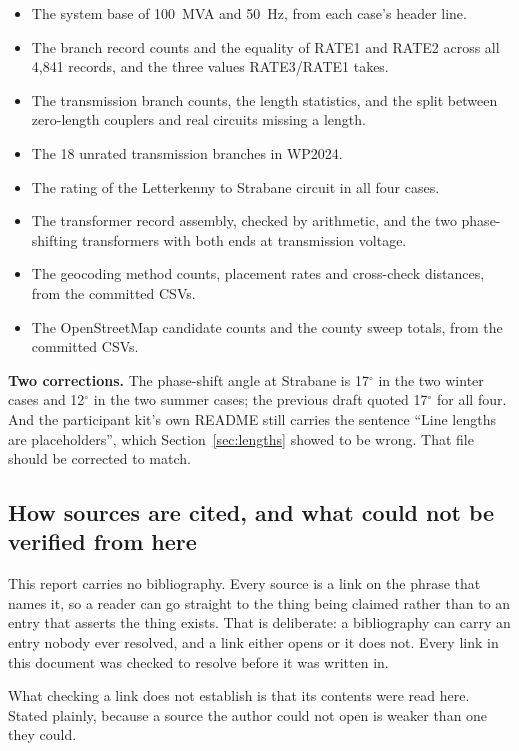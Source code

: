 \documentclass[11pt,a4paper]{article}
\begin{document}
\begin{itemize}
\item The system base of 100~MVA and 50~Hz, from each case's header line.
\item The branch record counts and the equality of RATE1 and RATE2 across all
      4{,}841 records, and the three values RATE3/RATE1 takes.
\item The transmission branch counts, the length statistics, and the split
      between zero-length couplers and real circuits missing a length.
\item The 18 unrated transmission branches in WP2024.
\item The rating of the Letterkenny to Strabane circuit in all four cases.
\item The transformer record assembly, checked by arithmetic, and the two
      phase-shifting transformers with both ends at transmission voltage.
\item The geocoding method counts, placement rates and cross-check distances,
      from the committed CSVs.
\item The OpenStreetMap candidate counts and the county sweep totals, from the
      committed CSVs.
\end{itemize}

\textbf{Two corrections.} The phase-shift angle at Strabane is 17$^\circ$ in
the two winter cases and 12$^\circ$ in the two summer cases; the previous draft
quoted 17$^\circ$ for all four. And the participant kit's own README still
carries the sentence ``Line lengths are placeholders'', which
Section~\ref{sec:lengths} showed to be wrong. That file should be corrected to
match.

\subsection{How sources are cited, and what could not be verified from here}

This report carries no bibliography. Every source is a link on the phrase that
names it, so a reader can go straight to the thing being claimed rather than to
an entry that asserts the thing exists. That is deliberate: a bibliography can
carry an entry nobody ever resolved, and a link either opens or it does not.
Every link in this document was checked to resolve before it was written in.

What checking a link does not establish is that its contents were read here.
Stated plainly, because a source the author could not open is weaker than one
they could.
\end{document}
